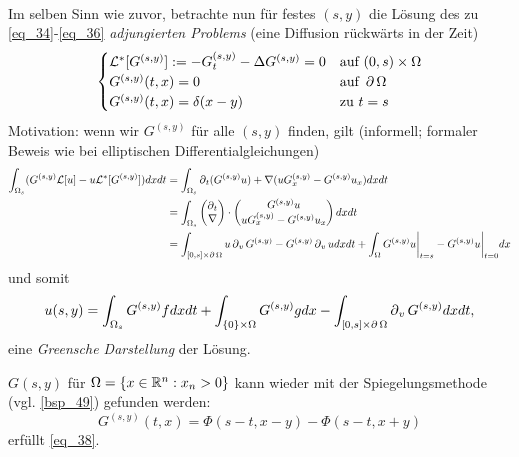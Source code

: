 \mbox{} \\
Im selben Sinn wie zuvor, betrachte nun für festes $(s,y)$ die Lösung des zu \eqref{eq_34}-\eqref{eq_36} \textit{adjungierten Problems} (eine Diffusion rückwärts in der Zeit)
\begin{equation}
	\begin{cases}
		\mathcal{L}^*[G^{(s,y)}] := -G_t^{(s,y)} - \Delta G^{(s,y)} = 0 & \text{auf } (0,s) \times \Omega \\
		G^{(s,y)}(t,x) = 0 & \text{auf } \operatorname{\partial} \Omega \\
		G^{(s,y)}(t,x) = \delta(x-y) & \text{zu } t=s \end{cases} \label{eq_38}
\end{equation}
Motivation: wenn wir $G^{(s,y)}$ für alle $(s,y)$ finden, gilt (informell; formaler Beweis wie bei elliptischen Differentialgleichungen)
\begin{equation}
\begin{aligned}
	\int_{\Omega_s} (G^{(s,y)} \mathcal{L}[u] - u \mathcal{L}^*[G^{(s,y)}]) dxdt
	&= \int_{\Omega_s} \operatorname{\partial}_t (G^{(s,y)} u) + \nabla(uG_x^{(s,y)} - G^{(s,y)} u_x) dx dt \\ \notag
	&= \int_{\Omega_s} \begin{pmatrix} \operatorname{\partial}_t \\ \nabla \end{pmatrix} \cdot \begin{pmatrix} G^{(s,y)} u \\ uG_x^{(s,y)} - G^{(s,y)} u_x \end{pmatrix} dxdt \\
	&= \int_{[0,s]\times \operatorname{\partial}\Omega} u \operatorname{\partial}_v G^{(s,y)} - G^{(s,y)} \operatorname{\partial}_v u dx dt + \int_\Omega G^{(s,y)} u \bigg|_{t=s} - G^{(s,y)} u \bigg|_{t=0} dx
\end{aligned}
\end{equation}
und somit
\[ u(s,y) = \int_{\Omega_s} G^{(s,y)} f dx dt + \int_{\{0\} \times \Omega} G^{(s,y)} gdx - \int_{[0,s]\times \operatorname{\partial} \Omega} \operatorname{\partial}_v G^{(s,y)} dx dt,\]
eine \textit{Greensche Darstellung} der Lösung.

\begin{bsp} \label{bsp_91}
	$G(s,y)$ für $\Omega = \{x \in \mathbb{R}^n : x_n > 0\}$ kann wieder mit der Spiegelungsmethode (vgl. \ref{bsp_49}) gefunden werden:
	\[ G^{(s,y)}(t,x) = \Phi(s-t,x-y) - \Phi(s-t,x+y) \]
	erfüllt \eqref{eq_38}.
\end{bsp}
\newpage
